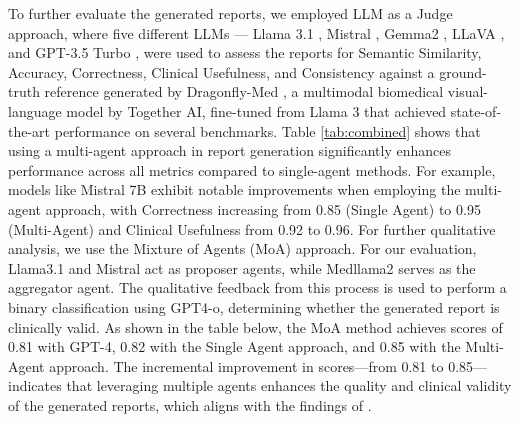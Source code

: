 \documentclass[runningheads]{llncs}
\begin{document}
To further evaluate the generated reports, we employed LLM as a Judge \cite{zheng2023judging} approach, where five different LLMs — Llama 3.1 \cite{dubey2024llama}, Mistral \cite{jiang2023mistral}, Gemma2 \cite{team2024gemma}, LLaVA \cite{liu2024improved}, and GPT-3.5 Turbo \cite{brown2020language}, were used to assess the reports for Semantic Similarity, Accuracy, Correctness, Clinical Usefulness, and Consistency against a ground-truth reference generated by Dragonfly-Med \cite{chen2024dragonfly}, a multimodal biomedical visual-language model by Together AI, fine-tuned from Llama 3 that achieved state-of-the-art performance on several benchmarks. Table \ref{tab:combined} shows that using a multi-agent approach in report generation significantly enhances performance across all metrics compared to single-agent methods. For example, models like Mistral 7B exhibit notable improvements when employing the multi-agent approach, with Correctness increasing from 0.85 (Single Agent) to 0.95 (Multi-Agent) and Clinical Usefulness from 0.92 to 0.96. For further qualitative analysis, we use the Mixture of Agents (MoA) \cite{wang2024mixture} approach. For our evaluation, Llama3.1 \cite{dubey2024llama} and Mistral \cite{jiang2023mistral} act as proposer agents, while Medllama2 serves as the aggregator agent. The qualitative feedback from this process is used to perform a binary classification using GPT4-o, determining whether the generated report is clinically valid. As shown in the table below, the MoA method achieves scores of 0.81 with GPT-4, 0.82 with the Single Agent approach, and 0.85 with the Multi-Agent approach. The incremental improvement in scores—from 0.81 to 0.85—indicates that leveraging multiple agents enhances the quality and clinical validity of the generated reports, which aligns with the findings of \cite{li2024more}.
\end{document}
